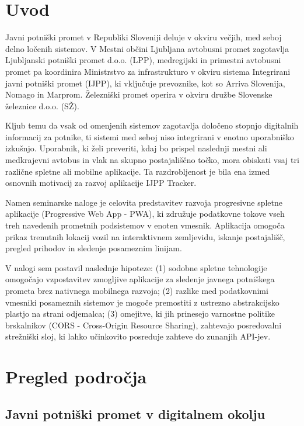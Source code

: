 \documentclass[12pt]{article}
\begin{document}
\newpage
\thispagestyle{empty}
\tableofcontents

\newpage
\section{Uvod}

Javni potniški promet v Republiki Sloveniji deluje v okviru večjih, med seboj delno ločenih sistemov. V Mestni občini Ljubljana avtobusni promet zagotavlja Ljubljanski potniški promet d.o.o. (LPP), medregijski in primestni avtobusni promet pa koordinira Ministrstvo za infrastrukturo v okviru sistema Integrirani javni potniški promet (IJPP), ki vključuje prevoznike, kot so Arriva Slovenija, Nomago in Marprom. Železniški promet operira v okviru družbe Slovenske železnice d.o.o. (SŽ).

Kljub temu da vsak od omenjenih sistemov zagotavlja določeno stopnjo digitalnih informacij za potnike, ti sistemi med seboj niso integrirani v enotno uporabniško izkušnjo. Uporabnik, ki želi preveriti, kdaj bo prispel naslednji mestni ali medkrajevni avtobus in vlak na skupno postajališčno točko, mora obiskati vsaj tri različne spletne ali mobilne aplikacije. Ta razdrobljenost je bila ena izmed osnovnih motivacij za razvoj aplikacije IJPP Tracker.

Namen seminarske naloge je celovita predstavitev razvoja progresivne spletne aplikacije (Progressive Web App - PWA), ki združuje podatkovne tokove vseh treh navedenih prometnih podsistemov v enoten vmesnik. Aplikacija omogoča prikaz trenutnih lokacij vozil na interaktivnem zemljevidu, iskanje postajališč, pregled prihodov in sledenje posameznim linijam.

V nalogi sem postavil naslednje hipoteze: (1) sodobne spletne tehnologije omogočajo vzpostavitev zmogljive aplikacije za sledenje javnega potniškega prometa brez nativnega mobilnega razvoja; (2) razlike med podatkovnimi vmesniki posameznih sistemov je mogoče premostiti z ustrezno abstrakcijsko plastjo na strani odjemalca; (3) omejitve, ki jih prinesejo varnostne politike brskalnikov (CORS - Cross-Origin Resource Sharing), zahtevajo posredovalni strežniški sloj, ki lahko učinkovito posreduje zahteve do zunanjih API-jev.

\section{Pregled področja}

\subsection{Javni potniški promet v digitalnem okolju}
\end{document}
